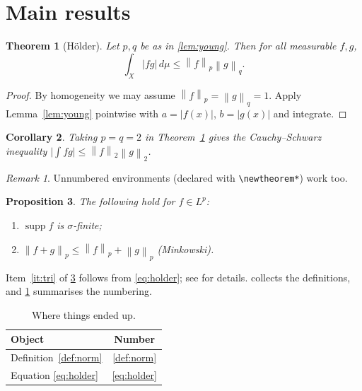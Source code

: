 \documentclass{amsart}
\newtheorem{theorem}{Theorem}[section]
\newtheorem{proposition}[theorem]{Proposition}
\newtheorem{corollary}[theorem]{Corollary}
\theoremstyle{definition}
\theoremstyle{remark}
\newtheorem*{remark}{Remark}
\numberwithin{equation}{section}
\newcommand{\norm}[1]{\left\lVert #1 \right\rVert}
\DeclareMathOperator{\supp}{supp}
\begin{document}
\section{Main results}\label{sec:main}

\begin{theorem}[H\"older]\label{thm:main}
Let $p, q$ be as in \cref{lem:young}. Then for all measurable $f, g$,
\begin{equation}\label{eq:holder}
  \int_X |fg| \, d\mu \le \norm{f}_p \norm{g}_q .
\end{equation}
\end{theorem}

\begin{proof}
By homogeneity we may assume $\norm{f}_p = \norm{g}_q = 1$. Apply
Lemma~\ref{lem:young} pointwise with $a = |f(x)|$, $b = |g(x)|$ and integrate.
\end{proof}

\begin{corollary}\label{cor:cs}
Taking $p = q = 2$ in Theorem~\ref{thm:main} gives the Cauchy--Schwarz
inequality $\bigl|\int fg\bigr| \le \norm{f}_2 \norm{g}_2$.
\end{corollary}

\begin{remark}
Unnumbered environments (declared with \verb|\newtheorem*|) work too.
\end{remark}

\begin{proposition}\label{prop:list}
The following hold for $f \in L^p$:
\begin{enumerate}[label=(\roman*)]
  \item\label{it:supp} $\supp f$ is $\sigma$-finite;
  \item\label{it:tri} $\norm{f + g}_p \le \norm{f}_p + \norm{g}_p$ (Minkowski).
\end{enumerate}
\end{proposition}

Item~\ref{it:tri} of \cref{prop:list} follows from \eqref{eq:holder};
see \cite{rudin} for details.  collects the definitions,
and \cref{tab:summary} summarises the numbering.

\begin{table}[h]
\centering
\begin{tabular}{|l|c|}
\hline
Object & Number \\
\hline
Definition~\ref{def:norm} & \ref{def:norm} \\
Equation \eqref{eq:holder} & \ref{eq:holder} \\
\hline
\end{tabular}
\caption{Where things ended up.}\label{tab:summary}
\end{table}
\end{document}
